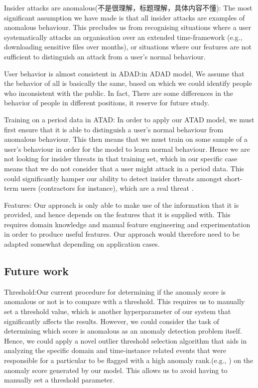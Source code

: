 \documentclass[conference]{IEEEtran}
\begin{document}
Insider attacks are anomalous(不是很理解，标题理解，具体内容不懂): The most significant assumption we have made is that all insider attacks are examples of anomalous behaviour. This precludes us from recognising situations where a user systematically attacks an organisation over an extended time-framework (e.g., downloading sensitive files over months), or situations where our features are not sufficient to distinguish an attack from a user’s normal behaviour.

User behavior is almost consistent in ADAD:in ADAD model, We assume that the behavior of all is basically the same, based on which we could identify people who inconsistent with the public. In fact, There are some differences in the behavior of people in different positions, it reserve for future study.

Training on a period data in ATAD: 
In order to apply our ATAD model, we must first ensure that it is able to distinguish a user’s normal behaviour from anomalous behaviour. This then means that we must train on some sample of a user’s behaviour in order for the model to learn normal behaviour. Hence we are not looking for insider threats in that training set, which in our specific case means that we do not consider that a user might attack in a period data. This could significantly hamper our ability to detect insider threats amongst short-term users (contractors for instance), which are a real threat \cite{b48}.

Features: Our approach is only able to make use of the information that it is provided, and hence depends on the features that it is supplied with. This requires domain knowledge and manual feature engineering and experimentation in order to produce useful features. Our approach would therefore need to be adapted somewhat depending on application cases.

\subsection{Future work} 
Threshold:Our current procedure for determining if the anomaly score is anomalous or not is to compare with a threshold. This requires us to manually set a threshold value, which is another hyperparameter of our system that significantly affects the results. However, we could consider the task of determining which score is anomalous as an anomaly detection problem itself. Hence, we could apply a novel outlier threshold selection algorithm that aids in analyzing the specific domain and time-instance related events that were responsible for a particular to be flagged with a high anomaly rank.(e.g., \cite{b49}) on the anomaly score generated by our model. This allows us to avoid having to manually set a threshold parameter.
\end{document}
